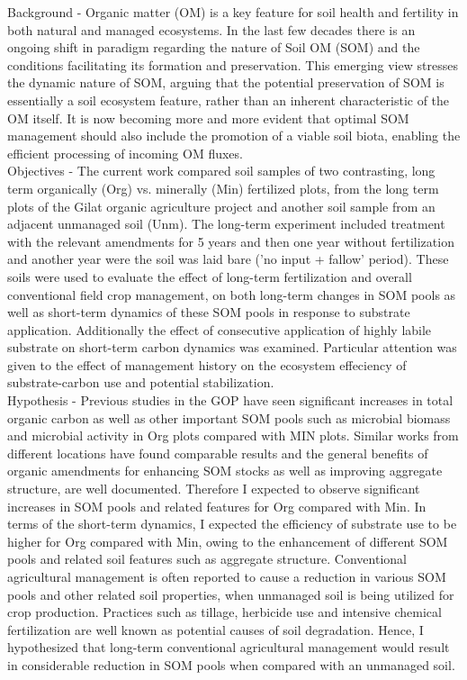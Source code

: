 	Background - Organic matter (OM) is a key feature for soil health and fertility in both natural and managed ecosystems. In the last few decades there is an ongoing shift in paradigm regarding the nature of Soil OM (SOM) and the conditions facilitating its formation and preservation. This emerging view stresses the dynamic nature of SOM, arguing that the potential preservation of SOM is essentially a soil ecosystem feature, rather than an inherent characteristic of the OM itself. It is now becoming more and more evident that optimal SOM management should also include the promotion of a viable soil biota, enabling the efficient processing of incoming OM fluxes.  \\

	Objectives - The current work compared soil samples of two contrasting, long term organically (Org) vs. minerally (Min) fertilized plots, from the long term plots of the Gilat organic agriculture project and another soil sample from an adjacent unmanaged soil (Unm). The long-term experiment included treatment with the relevant amendments for 5 years and then one year without fertilization and another year were the soil was laid bare ('no input + fallow' period). These soils were used to evaluate the effect of long-term fertilization and overall conventional field crop management, on both long-term changes in SOM pools as well as short-term dynamics of these SOM pools in response to substrate application. Additionally the effect of consecutive application of highly labile substrate on short-term carbon dynamics was examined. Particular attention was given to the effect of management history on the ecosystem effeciency of substrate-carbon use and potential stabilization.\\
	
	Hypothesis - Previous studies in the GOP have seen significant increases in total organic carbon as well as other important SOM pools such as microbial biomass and microbial activity in Org plots compared with MIN plots. Similar works from different locations have found comparable results and the general benefits of organic amendments for enhancing SOM stocks as well as improving aggregate  structure, are well documented. Therefore I expected to observe significant increases in SOM pools and related features for Org compared with Min. In terms of the short-term dynamics, I expected the efficiency of substrate use to be higher for Org compared with Min, owing to the enhancement of different SOM pools and related soil features such as aggregate structure. 
	Conventional agricultural management is often reported to cause a reduction in various SOM pools and other related soil properties, when unmanaged soil is being utilized for crop production. Practices such as tillage, herbicide use and intensive chemical fertilization are well known as potential causes of soil degradation. Hence, I hypothesized that long-term conventional agricultural management would result in considerable reduction in SOM pools when compared with an unmanaged soil.\\

